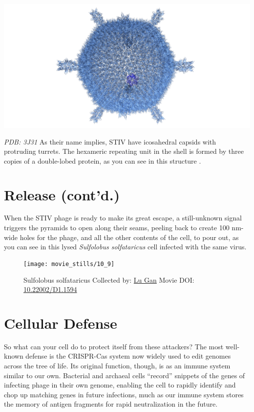 \documentclass[]{tufte-book}
\begin{document}
\includegraphics{img/schematics/10_8_1}

\emph{PDB: 3J31} As their name implies, STIV have icosahedral capsids
with protruding turrets. The hexameric repeating unit in the shell is
formed by three copies of a double-lobed protein, as you can see in this
structure \citep{veesler2013}.

\section{Release (cont'd.)}\label{release-contd.}

When the STIV phage is ready to make its great escape, a still-unknown
signal triggers the pyramids to open along their seams, peeling back to
create 100 nm-wide holes for the phage, and all the other contents of
the cell, to pour out, as you can see in this lysed \emph{Sulfolobus
solfataricus} cell infected with the same virus.





\begin{figure}
\texttt{[image: movie\_stills/10\_9]} \caption[Sulfolobus solfataricus Collected by:
\protect\hyperlink{lu_gan}{Lu Gan} Movie DOI:
\href{https://doi.org/10.22002/D1.1594}{10.22002/D1.1594}]{Sulfolobus solfataricus Collected by:
\protect\hyperlink{lu_gan}{Lu Gan} Movie DOI:
\href{https://doi.org/10.22002/D1.1594}{10.22002/D1.1594}}\label{fig:10-9}
\end{figure}

\section{Cellular Defense}\label{cellular-defense}

So what can your cell do to protect itself from these attackers? The
most well-known defense is the CRISPR-Cas system now widely used to edit
genomes across the tree of life. Its original function, though, is as an
immune system similar to our own. Bacterial and archaeal cells
``record'' snippets of the genes of infecting phage in their own genome,
enabling the cell to rapidly identify and chop up matching genes in
future infections, much as our immune system stores the memory of
antigen fragments for rapid neutralization in the future.
\end{document}
